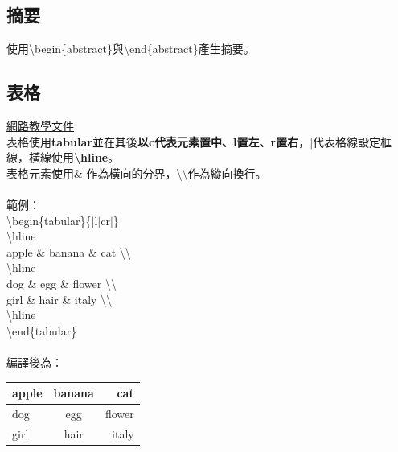 \documentclass[12pt]{article}
\begin{document}
\begin{CJK*}{UTF8}{bsmi}
			\subsection{摘要}
				\hspace*{2pc}使用\textbackslash begin\{abstract\}與\textbackslash end\{abstract\}產生摘要。
				
			\subsection{表格}
				\href{https://www.overleaf.com/learn/latex/Tables}{網路教學文件} \\
				\hspace*{2pc}表格使用\textbf{tabular}並在其後\textbf{以c代表元素置中、l置左、r置右}，\textbf{$\vert$}代表格線設定框線，橫線使用\textbf{\textbackslash hline}。 \\
				\hspace*{2pc}表格元素使用\& 作為橫向的分界，\textbackslash \textbackslash 作為縱向換行。 \\ \\
				範例： \\
				\hspace*{2pc}\textbackslash begin\{tabular\}\{$\vert$l$\vert$cr$\vert$\} \\
				\hspace*{4pc} \textbackslash hline \\
				\hspace*{4pc} apple \& banana \& cat \textbackslash \textbackslash \\
				\hspace*{4pc} \textbackslash hline \\
				\hspace*{4pc} dog \& egg \& flower \textbackslash \textbackslash \\
				\hspace*{4pc} girl \& hair \& italy \textbackslash \textbackslash \\
				\hspace*{4pc} \textbackslash hline \\
				\hspace*{2pc} \textbackslash end\{tabular\} \\ \\
				編譯後為：
				\begin{tabular}{|l|cr|}
					\hline
					apple & banana & cat \\
					\hline
					dog & egg & flower \\
					girl & hair & italy \\
					\hline
				\end{tabular}
			\newpage

\end{CJK*}
\end{document}
